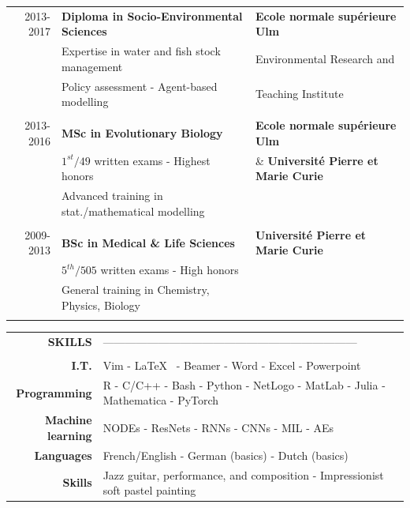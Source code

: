 \documentclass[11pt, oneside]{article}   	%
\begin{document}
\begin{tabular}{rll}
2013-2017 & \textbf{Diploma in Socio-Environmental Sciences} & \textbf{Ecole normale supérieure Ulm} \\
& Expertise in water and fish stock management & Environmental Research and \\
& Policy assessment - Agent-based modelling &  Teaching Institute \\
\\
2013-2016 & \textbf{MSc in Evolutionary Biology} & \textbf{Ecole normale supérieure Ulm} \\
	& $1^{st}/49$ written exams - Highest honors  & \& \textbf{Université Pierre et Marie Curie} \\
 & Advanced training in stat./mathematical modelling & \\
 \\
2009-2013 & \textbf{BSc in Medical \& Life Sciences} & \textbf{Université Pierre et Marie Curie} \\
 & $5^{th}/505$ written exams - High honors  & \\
& General training in Chemistry, Physics, Biology & \\
\\
\end{tabular}

\hspace{-2.5cm}
\begin{tabular}{rll}
\textbf{SKILLS} & --------------------------------------------------------------------- &  \\
\\
\textbf{I.T.} & Vim - \LaTeX~ - Beamer - Word - Excel - Powerpoint & \\
\textbf{Programming} & R - C/C++ - Bash - Python - NetLogo - MatLab - Julia - Mathematica - PyTorch & \\
\textbf{Machine learning} & NODEs - ResNets - RNNs - CNNs - MIL - AEs & \\
\textbf{Languages} & French/English - German (basics) - Dutch (basics) & \\
\textbf{Skills} & Jazz guitar, performance, and composition - Impressionist soft pastel painting
\end{tabular}
\end{document}
